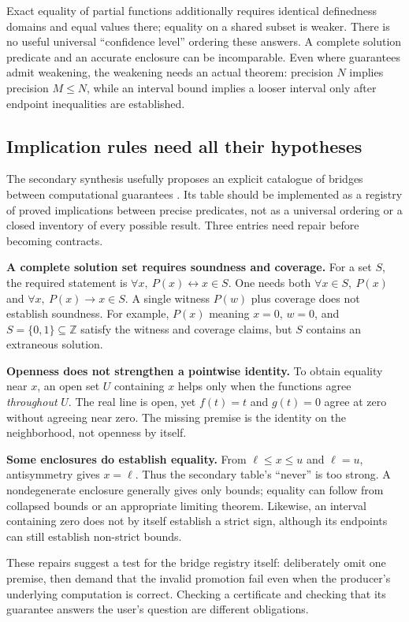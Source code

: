 \documentclass[11pt,letterpaper]{article}
\newcommand{\Z}{\mathbb Z}
\begin{document}
Exact equality of partial functions additionally requires identical definedness
domains and equal values there; equality on a shared subset is weaker.
There is no useful universal ``confidence level'' ordering these answers. A
complete solution predicate and an accurate enclosure can be incomparable.
Even where guarantees admit weakening, the weakening needs an actual theorem:
precision \(N\) implies precision \(M\le N\), while an interval bound implies
a looser interval only after endpoint inequalities are established.

\subsection{Implication rules need all their hypotheses}\label{sec:bridges}
The secondary synthesis usefully proposes an explicit catalogue of bridges
between computational guarantees \cite[\S9.1]{secondary}. Its table should
be implemented as a registry of proved implications between precise predicates,
not as a universal ordering or a closed inventory of every possible result.
Three entries need repair before becoming contracts.

\textbf{A complete solution set requires soundness and coverage.} For a set
\(S\), the required statement is \(\forall x,\ P(x)\leftrightarrow x\in S\).
One needs both \(\forall x\in S,\ P(x)\) and
\(\forall x,\ P(x)\to x\in S\). A single witness \(P(w)\) plus coverage does
not establish soundness. For example, \(P(x)\) meaning \(x=0\),
\(w=0\), and \(S=\{0,1\}\subseteq\Z\) satisfy the witness and coverage
claims, but \(S\) contains an extraneous solution.

\textbf{Openness does not strengthen a pointwise identity.} To obtain equality
near \(x\), an open set \(U\) containing \(x\) helps only when the functions
agree \emph{throughout} \(U\). The real line is open, yet \(f(t)=t\) and
\(g(t)=0\) agree at zero without agreeing near zero. The missing premise is
the identity on the neighborhood, not openness by itself.

\textbf{Some enclosures do establish equality.} From
\(\ell\le x\le u\) and \(\ell=u\), antisymmetry gives \(x=\ell\).
Thus the secondary table's ``never'' is too strong. A nondegenerate enclosure
generally gives only bounds; equality can follow from collapsed bounds or an
appropriate limiting theorem. Likewise, an interval containing zero does not
by itself establish a strict sign, although its endpoints can still establish
non-strict bounds.

These repairs suggest a test for the bridge registry itself: deliberately omit
one premise, then demand that the invalid promotion fail even when the producer's
underlying computation is correct. Checking a certificate and checking that its
guarantee answers the user's question are different obligations.
\end{document}

